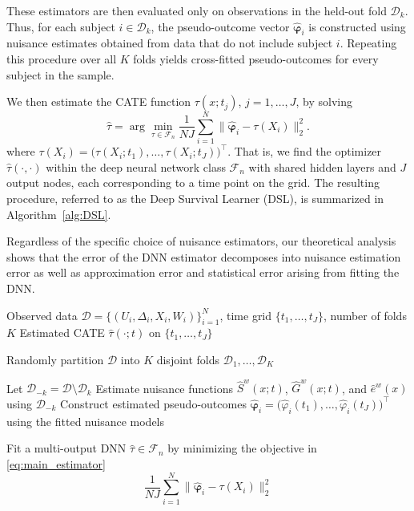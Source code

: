 \documentclass{article}
\begin{document}
These estimators are then evaluated only on observations in the held-out fold \(\mathcal D_k\). Thus, for each subject \(i\in\mathcal D_k\), the pseudo-outcome vector
\(
\hat{\boldsymbol{\varphi}}_i
\)
is constructed using nuisance estimates obtained from data that do not include subject \(i\).  Repeating this procedure over all $K$ folds yields cross-fitted pseudo-outcomes for every subject in the sample. 
 

We then estimate the CATE function $\tau(x;t_j)$, $j=1,\ldots,J$, by solving
\begin{equation}
\label{eq:main_estimator}
\hat\tau
=
\arg\min_{\tau \in \mathcal F_n}
\frac{1}{NJ}\sum_{i=1}^N
\bigl\|
\hat{\boldsymbol{\varphi}}_i - \tau(X_i)
\bigr\|_2^2.
\end{equation}
where $ \tau(X_i) = \bigl(\tau(X_i; t_1), \ldots, \tau(X_i; t_J) \bigr)^\top$. That is, we find the optimizer $\hat{\tau}(\cdot,\cdot)$ within the deep neural network class $\mathcal F_n$ with shared hidden layers and $J$ output nodes, each corresponding to a time point on the grid. The resulting procedure, referred to as the Deep Survival Learner (DSL), is summarized in Algorithm~\ref{alg:DSL}.

Regardless of the specific choice of nuisance estimators, our theoretical analysis shows that the error of the DNN estimator decomposes into nuisance estimation error as well as  approximation error and statistical error arising from fitting the DNN.

\begin{algorithm}[!htbp]
\caption{Deep Survival Learner (DSL)}
\label{alg:DSL}
\small
\begin{algorithmic}[1]
\Require Observed data $\mathcal D=\{(U_i,\Delta_i,X_i,W_i)\}_{i=1}^N$,
time grid $\{t_1,\ldots,t_J\}$, number of folds $K$
\Ensure Estimated CATE  $\hat\tau(\cdot;t)$ on $\{t_1,\ldots,t_J\}$

\State Randomly partition $\mathcal D$ into $K$ disjoint folds
$\mathcal D_1,\ldots,\mathcal D_K$

    \State Let $\mathcal D_{-k}=\mathcal D\setminus \mathcal D_k$
    \State Estimate nuisance functions
    $\hat S^w(x;t)$, $\hat G^w(x;t)$, and $\hat e^w(x)$ using $\mathcal D_{-k}$
        \State Construct estimated pseudo-outcomes
        \(
        \hat{\boldsymbol{\varphi}}_i
        =
        \bigl(\hat{\varphi}_i(t_1),\ldots,\hat{\varphi}_i(t_J)\bigr)^\top
        \)
         using the fitted nuisance models
    \EndFor
\EndFor

\State Fit a multi-output DNN $\hat\tau \in \mathcal F_n$ by minimizing the objective in \eqref{eq:main_estimator}
\[
\frac{1}{NJ}\sum_{i=1}^N
\bigl\|
\hat{\boldsymbol{\varphi}}_i - \tau(X_i)
\bigr\|_2^2
\]

\end{algorithmic}
\end{algorithm}
\end{document}
